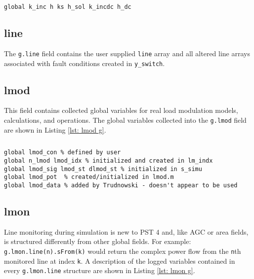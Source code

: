 \begin{lstlisting}[caption={Index Related Global Field Variables},label={lst: k g}]
\end{lstlisting}\vspace{-2 em}
\begin{verbatim}
global k_inc h ks h_sol k_incdc h_dc
\end{verbatim}

\subsection{line}  
The \verb|g.line| field contains the user supplied \verb|line| array and all altered line arrays associated with fault conditions created in \verb|y_switch|.

\subsection{lmod}
This field contains collected global variables for real load modulation models, calculations, and operations.
The global variables collected into the \verb|g.lmod| field are shown in Listing \ref{lst: lmod g}.

\begin{lstlisting}[caption={Real Load Modulation Global Field Variables},label={lst: lmod g}]
\end{lstlisting}\vspace{-2 em}
\begin{verbatim}
global lmod_con % defined by user
global n_lmod lmod_idx % initialized and created in lm_indx
global lmod_sig lmod_st dlmod_st % initialized in s_simu
global lmod_pot  % created/initialized in lmod.m 
global lmod_data % added by Trudnowski - doesn't appear to be used
\end{verbatim}

\pagebreak
\subsection{lmon}  
Line monitoring during simulation is new to PST 4 and, like AGC or area fields, is structured  differently from other global fields.
For example:\\ \verb|g.lmon.line(n).sFrom(k)| would return the complex power flow from the \verb|n|th monitored line at index \verb|k|.
A description of the logged variables contained in every \verb|g.lmon.line| structure are  shown in Listing \ref{lst: lmon g}.

